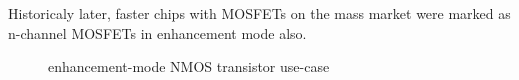 Historicaly later, faster chips with MOSFETs on the mass market were marked as n-channel MOSFETs in enhancement mode also.

\begin{center}
	\begin{figure}[h]
		\begin{center}
			\begin{circuitdiagram}{20}{20}
			\end{circuitdiagram}
		\end{center}
		\caption{enhancement-mode NMOS transistor use-case}
	\end{figure}
\end{center}

